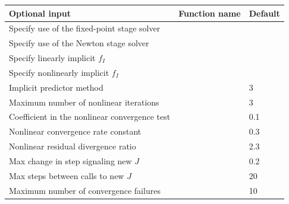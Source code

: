 \documentclass[letterpaper,10pt,english]{sphinxmanual}
\begin{document}
\begin{tabulary}{\linewidth}{|L|L|L|}
\hline
\textbf{
Optional input
} & \textbf{
Function name
} & \textbf{
Default
}\\\hline

Specify use of the fixed-point stage solver
 & 
{\hyperref[c_interface/User_callable:ARKodeSetFixedPoint]{}}
 & 
\\\hline

Specify use of the Newton stage solver
 & 
{\hyperref[c_interface/User_callable:ARKodeSetNewton]{}}
 & 
\\\hline

Specify linearly implicit $f_I$
 & 
{\hyperref[c_interface/User_callable:ARKodeSetLinear]{}}
 & 
\\\hline

Specify nonlinearly implicit $f_I$
 & 
{\hyperref[c_interface/User_callable:ARKodeSetNonlinear]{}}
 & 
\\\hline

Implicit predictor method
 & 
{\hyperref[c_interface/User_callable:ARKodeSetPredictorMethod]{}}
 & 
3
\\\hline

Maximum number of nonlinear iterations
 & 
{\hyperref[c_interface/User_callable:ARKodeSetMaxNonlinIters]{}}
 & 
3
\\\hline

Coefficient in the nonlinear convergence test
 & 
{\hyperref[c_interface/User_callable:ARKodeSetNonlinConvCoef]{}}
 & 
0.1
\\\hline

Nonlinear convergence rate constant
 & 
{\hyperref[c_interface/User_callable:ARKodeSetNonlinCRDown]{}}
 & 
0.3
\\\hline

Nonlinear residual divergence ratio
 & 
{\hyperref[c_interface/User_callable:ARKodeSetNonlinRDiv]{}}
 & 
2.3
\\\hline

Max change in step signaling new $J$
 & 
{\hyperref[c_interface/User_callable:ARKodeSetDeltaGammaMax]{}}
 & 
0.2
\\\hline

Max steps between calls to new $J$
 & 
{\hyperref[c_interface/User_callable:ARKodeSetMaxStepsBetweenLSet]{}}
 & 
20
\\\hline

Maximum number of convergence failures
 & 
{\hyperref[c_interface/User_callable:ARKodeSetMaxConvFails]{}}
 & 
10
\\\hline
\end{tabulary}
\end{document}
